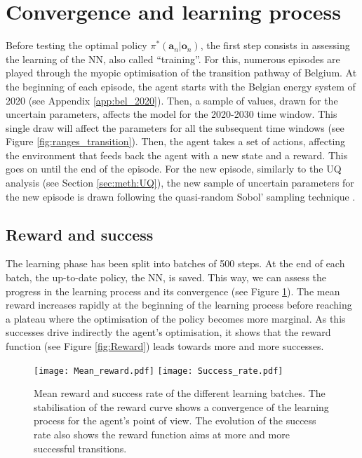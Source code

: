 \section{Convergence and learning process}
\label{sec:RL:learning}

Before testing the optimal policy $\pi^*\left(\bm{a}_n | \bm{o}_n\right)$, the first step consists in assessing the learning of the \gls{NN}, also called ``training''. For this, numerous episodes are played through the myopic optimisation of the transition pathway of Belgium. At the beginning of each episode, the agent starts with the Belgian energy system of 2020 (see Appendix \ref{app:bel_2020}). Then, a sample of values, drawn for the uncertain parameters, affects the model for the 2020-2030 time window. This single draw will affect the parameters for all the subsequent time windows (see Figure \ref{fig:ranges_transition}).  Then, the agent takes a set of actions, affecting the environment that feeds back the agent with a new state and a reward. This goes on until the end of the episode. For the new episode, similarly to the \gls{UQ} analysis (see Section \ref{sec:meth:UQ}), the new sample of uncertain parameters for the new episode is drawn following the quasi-random Sobol' sampling technique \cite{bratley2003implementing}.

\subsection{Reward and success}
\label{subsec:RL:learning:rew_succ}

The learning phase has been split into batches of 500 steps. %
At the end of each batch, the up-to-date policy, \ie the \gls{NN}, is saved. This way, we can assess the progress in the learning process and its convergence (see Figure \ref{fig:reward_success}).  The mean reward increases rapidly at the beginning of the learning process before reaching a plateau where the optimisation of the policy becomes more marginal.  As this successes drive indirectly the agent's optimisation, it shows that the reward function (see Figure \ref{fig:Reward}) leads towards more and more successes. 

\begin{figure}[!htbp]
\centering
\texttt{[image: Mean\_reward.pdf]}
\texttt{[image: Success\_rate.pdf]}
\caption{Mean reward and success rate of the different learning batches. The stabilisation of the reward curve shows a convergence of the learning process for the agent's point of view. The evolution of the success rate also shows the reward function aims at more and more successful transitions.}
\label{fig:reward_success}
\end{figure}

